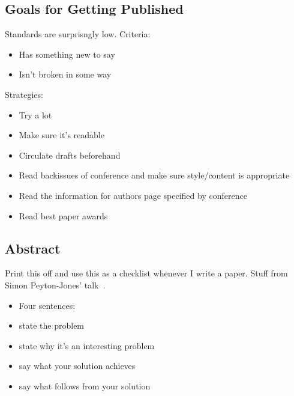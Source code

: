 \subsection{Goals for Getting Published}
Standards are surprisngly low.
Criteria:
\begin{itemize}
\item Has something new to say
\item Isn't broken in some way
\end{itemize}

Strategies:
\begin{itemize}
\item Try a lot
\item Make sure it's readable
\item Circulate drafts beforehand
\item Read backissues of conference and make sure style/content is appropriate
\item Read the information for authors page specified by conference
\item Read best paper awards
\end{itemize}

\subsection{Abstract}
Print this off and use this as a checklist whenever I write a paper.
Stuff from Simon Peyton-Jones' talk~\cite{jones2013how}.

\begin{itemize}
\item Four sentences:
\item state the problem
\item state why it's an interesting problem
\item say what your solution achieves
\item say what follows from your solution
\end{itemize}

